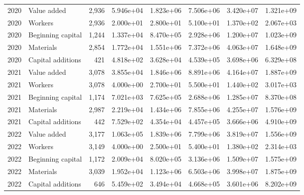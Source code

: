 \begin{longtable}{llrrrrrr}
2020 & Value added & 2,936 & 5.946e+04 & 1.823e+06 & 7.506e+06 & 3.420e+07 & 1.321e+09 \\
2020 & Workers & 2,936 & 2.000e+01 & 2.800e+01 & 5.100e+01 & 1.370e+02 & 2.067e+03 \\
2020 & Beginning capital & 1,244 & 1.337e+04 & 8.470e+05 & 2.928e+06 & 1.200e+07 & 1.023e+09 \\
2020 & Materials & 2,854 & 1.772e+04 & 1.551e+06 & 7.372e+06 & 4.063e+07 & 1.648e+09 \\
2020 & Capital additions & 421 & 4.818e+02 & 3.628e+04 & 4.539e+05 & 3.698e+06 & 6.329e+08 \\
2021 & Value added & 3,078 & 3.855e+04 & 1.846e+06 & 8.891e+06 & 4.164e+07 & 1.887e+09 \\
2021 & Workers & 3,078 & 4.000e+00 & 2.700e+01 & 5.500e+01 & 1.440e+02 & 3.017e+03 \\
2021 & Beginning capital & 1,174 & 7.021e+03 & 7.625e+05 & 2.688e+06 & 1.285e+07 & 8.370e+08 \\
2021 & Materials & 2,987 & 2.219e+04 & 1.434e+06 & 7.855e+06 & 4.255e+07 & 1.576e+09 \\
2021 & Capital additions & 442 & 7.529e+02 & 4.354e+04 & 4.457e+05 & 3.666e+06 & 4.910e+09 \\
2022 & Value added & 3,177 & 1.063e+05 & 1.839e+06 & 7.799e+06 & 3.819e+07 & 1.556e+09 \\
2022 & Workers & 3,149 & 4.000e+00 & 2.500e+01 & 5.400e+01 & 1.380e+02 & 2.314e+03 \\
2022 & Beginning capital & 1,172 & 2.009e+04 & 8.020e+05 & 3.136e+06 & 1.509e+07 & 1.575e+09 \\
2022 & Materials & 3,039 & 1.952e+04 & 1.123e+06 & 6.503e+06 & 3.998e+07 & 1.875e+09 \\
2022 & Capital additions & 646 & 5.459e+02 & 3.494e+04 & 4.668e+05 & 3.601e+06 & 8.202e+09 \\
\end{longtable}
\endgroup
{}
